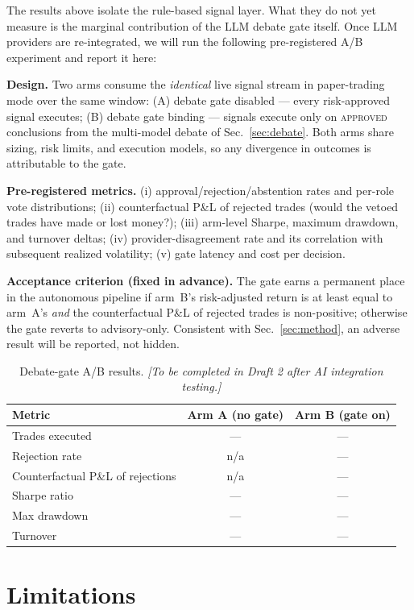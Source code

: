 \documentclass[10pt,twocolumn]{IEEEtran}
\begin{document}
The results above isolate the rule-based signal layer. What they do not yet
measure is the marginal contribution of the LLM debate gate itself. Once LLM
providers are re-integrated, we will run the following pre-registered A/B
experiment and report it here:

\textbf{Design.} Two arms consume the \emph{identical} live signal stream in
paper-trading mode over the same window: (A) debate gate disabled ---
every risk-approved signal executes; (B) debate gate binding --- signals
execute only on \textsc{approved} conclusions from the multi-model debate of
Sec.~\ref{sec:debate}. Both arms share sizing, risk limits, and execution
models, so any divergence in outcomes is attributable to the gate.

\textbf{Pre-registered metrics.} (i) approval/rejection/abstention rates and
per-role vote distributions; (ii) counterfactual P\&L of rejected trades
(would the vetoed trades have made or lost money?); (iii) arm-level Sharpe,
maximum drawdown, and turnover deltas; (iv) provider-disagreement rate and
its correlation with subsequent realized volatility; (v) gate latency and
cost per decision.

\textbf{Acceptance criterion (fixed in advance).} The gate earns a permanent
place in the autonomous pipeline if arm~B's risk-adjusted return is at least
equal to arm~A's \emph{and} the counterfactual P\&L of rejected trades is
non-positive; otherwise the gate reverts to advisory-only. Consistent with
Sec.~\ref{sec:method}, an adverse result will be reported, not hidden.

\begin{table}[t]
\caption{Debate-gate A/B results. \emph{[To be completed in Draft 2 after
AI integration testing.]}}
\label{tab:abtest}
\centering
\begin{tabular}{lcc}
\toprule
Metric & Arm A (no gate) & Arm B (gate on) \\
\midrule
Trades executed & --- & --- \\
Rejection rate & n/a & --- \\
Counterfactual P\&L of rejections & n/a & --- \\
Sharpe ratio & --- & --- \\
Max drawdown & --- & --- \\
Turnover & --- & --- \\
\bottomrule
\end{tabular}
\end{table}

\section{Limitations}
\end{document}
